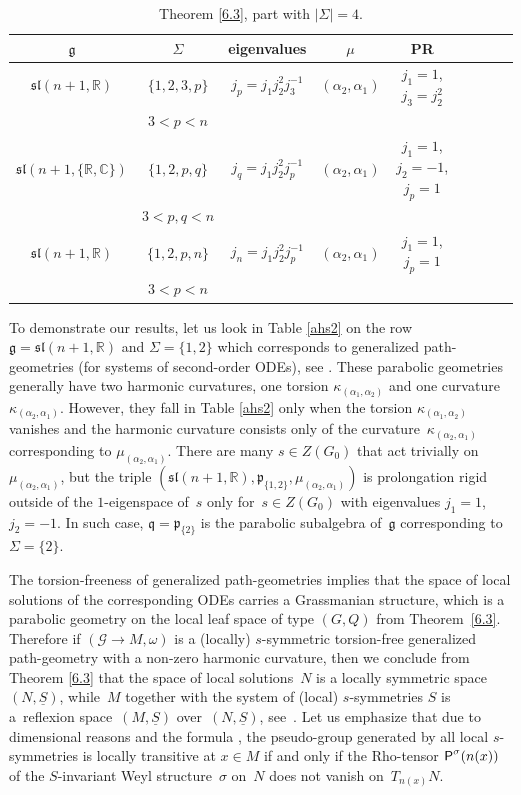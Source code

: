 \documentclass[pdftex]{sigma}
\newcommand{\om}{\omega}
\newcommand{\si}{\sigma}
\newcommand{\Si}{\Sigma}
\newcommand{\un}{\underline}
\newcommand{\ba}{\mathcal{G}}
\newcommand{\fg}{\mathfrak g}
\newcommand{\fv}{\mathfrak q}
\newcommand{\fp}{\mathfrak p}
\newcommand{\Rho}{{\mbox{\sf P}}}
\newcommand{\R}{\mathbb{R}}
\newcommand{\C}{\mathbb{C}}
\numberwithin{equation}{section}
\begin{document}
\begin{table}[th!]\centering\caption{Theorem \ref{6.3}, part with $|\Si|=4$.}\label{ahs4}\vspace{1mm}
\begin{tabular}{|c|c|c|c|c|c|c|c|c|}
\hline
$\fg$ & $\Sigma$ & eigenvalues& $\mu$& PR \\
\hline
\hline
$\mathfrak{sl}(n+1,\mathbb{R})$ & $\{1,2,3,p\}$ &$j_p=j_1j_2^2j_3^{-1}$&$(\alpha_2,\alpha_1)$& $j_1=1$, $j_3=j_2^2$\\
& $3<p<n$& & &\\
\hline
$\mathfrak{sl}(n+1,\{\mathbb{R},\C\})$ & $\{1,2,p,q\}$&$j_q=j_1j_2^2j_p^{-1}$&$(\alpha_2,\alpha_1)$& $j_1=1$, $j_2=-1$, $j_p=1$\\
& $3<p,q<n$& & &\\
\hline
$\mathfrak{sl}(n+1,\mathbb{R})$ & $\{1,2,p,n\}$&$j_n=j_1j_2^2j_p^{-1}$&$(\alpha_2,\alpha_1)$& $j_1=1$, $j_p=1$\\
& $3<p<n$& & &\\
\hline
\end{tabular}
\end{table}

\begin{Example}\label{expg}To demonstrate our results, let us look in Table \ref{ahs2} on the row $\fg=\mathfrak{sl}(n+1,\R)$ and $\Sigma=\{1,2\}$ which corresponds to generalized path-geometries (for systems of second-order ODEs), see \cite[Sections 4.4.3--4.4.5]{parabook}. These parabolic geometries generally have two harmonic curvatures, one torsion $\kappa_{(\alpha_1,\alpha_2)}$ and one curvature $\kappa_{(\alpha_2,\alpha_1)}$. However, they fall in Table \ref{ahs2} only when the torsion $\kappa_{(\alpha_1,\alpha_2)}$ vanishes and the harmonic curvature consists only of the curva\-tu\-re~$\kappa_{(\alpha_2,\alpha_1)}$ corresponding to $\mu_{(\alpha_2,\alpha_1)}$. There are many $s\in Z(G_0)$ that act trivially on $\mu_{(\alpha_2,\alpha_1)}$, but the triple $(\mathfrak{sl}(n+1,\R),\fp_{\{1,2\}},\mu_{(\alpha_2,\alpha_1)})$ is prolongation rigid outside of the $1$-eigenspace of~$s$ only for~$s\in Z(G_0)$ with eigenvalues $j_1=1$, $j_2=-1$. In such case, $\fv=\fp_{\{2\}}$ is the parabolic subalgebra of~$\fg$ corresponding to $\Sigma=\{2\}$.

The torsion-freeness of generalized path-geometries implies that the space of local solutions of the corresponding ODEs carries a Grassmanian structure, which is a parabolic geometry on the local leaf space of type $(G,Q)$ from Theorem~\ref{6.3}.
Therefore if $(\ba\to M,\om)$ is a (locally) $s$-symmetric torsion-free generalized path-geometry with a non-zero harmonic curvature, then we conclude from Theorem \ref{6.3} that the space of local solutions~$N$ is a locally symmetric space~$(N,\un S)$, while~$M$ together with the system of (local) $s$-symmetries $S$ is a~ref\/lexion space~$(M,\un S)$ over~$(N,\un S)$, see~\cite{G1}. Let us emphasize that due to dimensional reasons and the formula \cite[Theorem~5.2.9]{parabook}, the pseudo-group generated by all local $s$-symmetries is locally transitive at $x\in M$ if and only if the Rho-tensor $\Rho^\si(n(x))$ of the $S$-invariant Weyl structure~$\si$ on~$N$ does not vanish on~$T_{n(x)}N$.
\end{Example}
\end{document}

